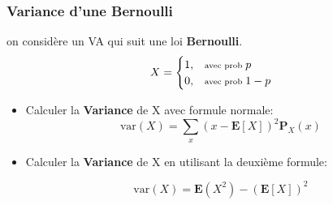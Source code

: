 \documentclass{beamer}
\renewcommand{\P}{\mathbf{P}}
\newcommand{\E}{\mathbf{E}}
\newcommand{\var}{\text{var}}
\begin{document}
\begin{frame}[t]
  \frametitle{Variance d'une Bernoulli}
  on considère un \ac{VA}  qui suit une loi \alert{\textbf{Bernoulli}}.
  \begin{equation*}
    X = \begin{cases}
       1, & \text{\scriptsize avec prob } p\\ 
       0, & \text{\scriptsize avec prob } 1-p
    \end{cases}
  \end{equation*}
 \pause 
  \begin{itemize}
    \item Calculer la \alert{\textbf{Variance}}  de X avec formule normale:
      \begin{equation*}
        \var(X) = \sum_x ( x - \E[X])^2\P_X(x)
      \end{equation*}
  \end{itemize}
  \vspace*{1cm}
  \begin{itemize}
    \item Calculer la \alert{\textbf{Variance}}  de X en utilisant la deuxième
      formule:
    
      \begin{equation*}
        \var(X) = \E(X^2) - (\E[X])^2
      \end{equation*}
  \end{itemize}
\end{frame}
\end{document}
